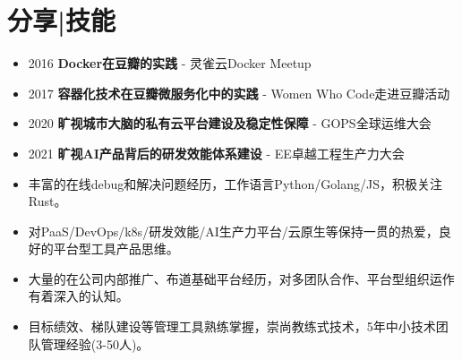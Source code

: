 \documentclass{resume}
\begin{document}
\section{分享|技能}
\begin{itemize}
    \item 2016 \quad \textbf{Docker在豆瓣的实践 } - 灵雀云Docker Meetup
    \item 2017 \quad \textbf{容器化技术在豆瓣微服务化中的实践 } - Women Who Code走进豆瓣活动
    \item 2020 \quad \textbf{旷视城市大脑的私有云平台建设及稳定性保障} - GOPS全球运维大会
    \item 2021 \quad \textbf{旷视AI产品背后的研发效能体系建设} - EE卓越工程生产力大会
\end{itemize}
\begin{itemize}
    \item 丰富的在线debug和解决问题经历，工作语言Python/Golang/JS，积极关注Rust。
		\item 对PaaS/DevOps/k8s/研发效能/AI生产力平台/云原生等保持一贯的热爱，良好的平台型工具产品思维。
		\item 大量的在公司内部推广、布道基础平台经历，对多团队合作、平台型组织运作有着深入的认知。
		\item 目标绩效、梯队建设等管理工具熟练掌握，崇尚教练式技术，5年中小技术团队管理经验(3-50人)。
\end{itemize}
\end{document}
